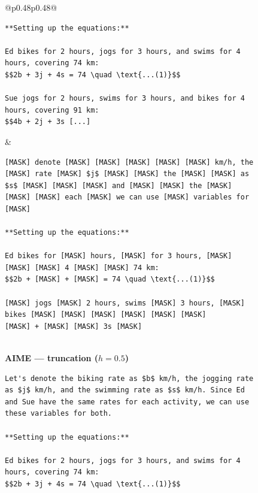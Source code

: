 \begin{figure}[p]
\begin{tabular}{@{}p{}p{}@{}}
\begin{tcolorbox}
\begin{lstlisting}
**Setting up the equations:**

Ed bikes for 2 hours, jogs for 3 hours, and swims for 4 hours, covering 74 km:
$$2b + 3j + 4s = 74 \quad \text{...(1)}$$

Sue jogs for 2 hours, swims for 3 hours, and bikes for 4 hours, covering 91 km:
$$4b + 2j + 3s [...]
\end{lstlisting}
\end{tcolorbox} & \begin{tcolorbox}[
    colback=gray!3, colframe=red!60!black, boxrule=0.5pt,
    title={\scriptsize\textbf{masking applied}},
    fonttitle=\sffamily, coltitle=white, colbacktitle=red!60!black,
    left=3pt, right=3pt, top=1pt, bottom=1pt
]
\begin{lstlisting}
[MASK] denote [MASK] [MASK] [MASK] [MASK] [MASK] km/h, the [MASK] rate [MASK] $j$ [MASK] [MASK] the [MASK] [MASK] as $s$ [MASK] [MASK] [MASK] and [MASK] [MASK] the [MASK] [MASK] [MASK] each [MASK] we can use [MASK] variables for [MASK]

**Setting up the equations:**

Ed bikes for [MASK] hours, [MASK] for 3 hours, [MASK] [MASK] [MASK] 4 [MASK] [MASK] 74 km:
$$2b + [MASK] + [MASK] = 74 \quad \text{...(1)}$$

[MASK] jogs [MASK] 2 hours, swims [MASK] 3 hours, [MASK] bikes [MASK] [MASK] [MASK] [MASK] [MASK] [MASK]
[MASK] + [MASK] [MASK] 3s [MASK]
\end{lstlisting}
\end{tcolorbox} \\[6pt]
\textbf{\sffamily\small AIME --- truncation ($h = 0.5$)} \\[2pt]
\begin{tcolorbox}[
    colback=gray!3, colframe=blue!60!black, boxrule=0.5pt,
    title={\scriptsize\textbf{full hint}},
    fonttitle=\sffamily, coltitle=white, colbacktitle=blue!60!black,
    left=3pt, right=3pt, top=1pt, bottom=1pt
]
\begin{lstlisting}
Let's denote the biking rate as $b$ km/h, the jogging rate as $j$ km/h, and the swimming rate as $s$ km/h. Since Ed and Sue have the same rates for each activity, we can use these variables for both.

**Setting up the equations:**

Ed bikes for 2 hours, jogs for 3 hours, and swims for 4 hours, covering 74 km:
$$2b + 3j + 4s = 74 \quad \text{...(1)}$$


\end{lstlisting}
\end{tcolorbox}
\end{tabular}
\end{figure}

